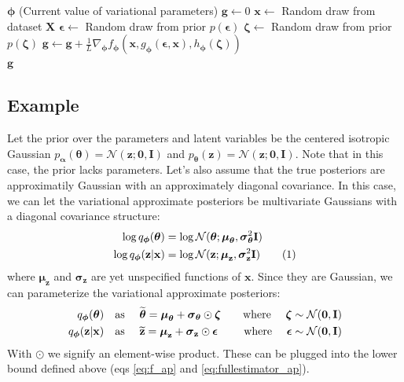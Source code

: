 \documentclass{article} %
\theoremstyle{definition}
\newcommand{\bb}[1]{\mathbf{#1}}
\newcommand{\bx}{\bb{x}}
\newcommand{\bg}{\bb{g}}
\newcommand{\bz}{\bb{z}}
\newcommand{\bT}{\boldsymbol{\theta}}
\newcommand{\balpha}{\boldsymbol{\alpha}}
\newcommand{\bphi}{\boldsymbol{\phi}}
\newcommand{\beps}{\boldsymbol{\epsilon}}
\newcommand{\bzeta}{\boldsymbol{\zeta}}
\newcommand{\bsigma}{\boldsymbol{\sigma}}
\newcommand{\bmu}{\boldsymbol{\mu}}
\newcommand{\bzero}{\bb{0}}
\newcommand{\bI}{\bb{I}}
\newcommand{\bX}{\bb{X}}
\newcommand{\btz}{\widetilde{\bz}}
\newcommand{\btT}{\widetilde{\bT}}
\newcommand{\pT}{p_{\bT}}
\newcommand{\pA}{p_{\balpha}}
\newcommand{\qPhi}{q_{\bphi}}
\newcommand{\fPhi}{f_{\bphi}}
\newcommand{\gPhi}{g_{\bphi}}
\newcommand{\hPhi}{h_{\bphi}}
\newcommand{\eqnr}{\addtocounter{equation}{1}\tag{\theequation}}
\theoremstyle{definition}
\begin{document}
\begin{algorithm}[t]
\caption{Pseudocode for computing a stochastic gradient using our estimator. See text for meaning of the functions $\fPhi$, $\gPhi$ and $\hPhi$. }
\renewcommand{\algorithmicforall}{\textbf{for each}}
\begin{algorithmic}
\Require $\bphi$ (Current value of variational parameters)
\State $\bg \gets 0$
\State $\bx \gets $ Random draw from dataset $\bX$
\State $\beps \gets $ Random draw from prior $p(\beps)$
\State $\bzeta \gets $ Random draw from prior $p(\bzeta)$
\State $\bg \gets \bg + \frac{1}{L} \nabla_{\bphi} \fPhi(\bx, \gPhi(\beps, \bx), \hPhi(\bzeta))$
\EndFor \\
\Return $\bg$
\end{algorithmic}
\label{algorithm_ap}
\end{algorithm}

\subsection{Example}
Let the prior over the parameters and latent variables be the centered isotropic Gaussian $\pA(\bT) = \mathcal{N}(\bz; \bzero, \bI)$ and $\pT(\bz) = \mathcal{N}(\bz; \bzero, \bI)$. Note that in this case, the prior lacks parameters. Let's also assume that the true posteriors are approximatily Gaussian with an approximately diagonal covariance. In this case, we can let the variational approximate posteriors be multivariate Gaussians with a diagonal covariance structure:
\begin{align*}
\log \qPhi(\bT) &= \log \mathcal{N}(\bT; \bmu_{\bT}, \bsigma_{\bT}^2 \bI) \\
\log \qPhi(\bz|\bx)
&= \log \mathcal{N}(\bz; \bmu_{\bz}, \bsigma_{\bz}^2 \bI)
\eqnr\end{align*}
where $\bmu_{\bz}$ and $\bsigma_{\bz}$ are yet unspecified functions of $\bx$.
Since they are Gaussian, we can parameterize the variational approximate posteriors:
\begin{align*}
\qPhi(\bT) &\text{\quad as \quad} \btT = \bmu_{\bT} + \bsigma_{\bT} \odot \bzeta
&\text{\quad where \quad} \bzeta \sim \mathcal{N}(\bzero,\bI) \\
\qPhi(\bz|\bx) &\text{\quad as \quad} \btz = \bmu_{\bz} + \bsigma_{\bz} \odot \beps
&\text{\quad where \quad} \beps \sim \mathcal{N}(\bzero,\bI) 
\end{align*}
With $\odot$ we signify an element-wise product. These can be plugged into the lower bound defined above (eqs \eqref{eq:f_ap} and \eqref{eq:fullestimator_ap}).
\end{document}
